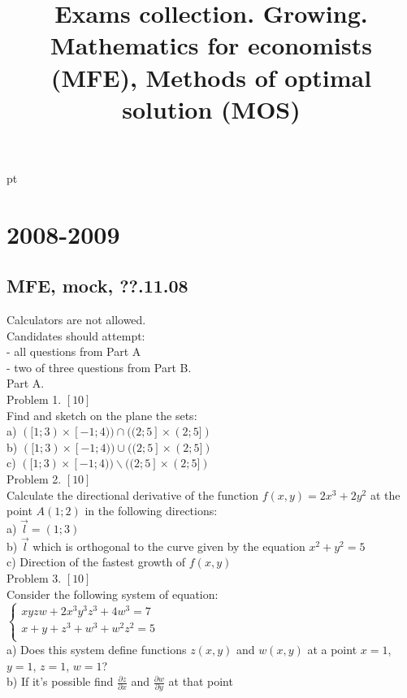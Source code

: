 \documentclass[12pt]{article} %
\title{Exams collection. Growing. Mathematics for economists (MFE), Methods of optimal solution (MOS) }
\theoremstyle{definition} %
\begin{document}
{} pt %

\maketitle

\tableofcontents{}

\section{2008-2009}

\subsection{MFE, mock, ??.11.08}

Calculators are not allowed. \\

Candidates should attempt:\\
- all questions from Part A \\
- two of three questions from Part B. \\


Part A. \\

Problem 1. $[10]$ \\
Find and sketch on the plane the sets:\\
a)	$([1;3)\times[-1;4))\cap ((2;5]\times(2;5])$\\
b)	$([1;3)\times[-1;4))\cup ((2;5]\times(2;5])$\\
c)	$([1;3)\times[-1;4))\backslash ((2;5]\times(2;5])$\\

Problem 2. $[10]$ \\
Calculate the directional derivative of the function $f(x,y)=2x^3+2y^2$ at the point $A(1;2)$ in the following directions:\\
a)	$\vec{l}=(1;3)$ \\
b)	$\vec{l}$ which is orthogonal to the curve given by the equation $x^2+y^2=5$\\
c)	Direction of the fastest growth of $f(x,y)$\\

Problem 3. $[10]$ \\
Consider the following system of equation:\\
$\left\{\begin{array}{l}
xyzw+2x^3y^3z^3+4w^3=7\\
x+y+z^3+w^3+w^2z^2=5\\
\end{array}\right.$\\
a)	Does this system define functions $z(x,y)$ and $w(x,y)$ at a point $x=1$, $y=1$, $z=1$, $w=1$?\\
b)	If it's possible find $\frac{\partial z}{\partial x}$ and $\frac{\partial w}{\partial y}$ at that point\\
\end{document}
